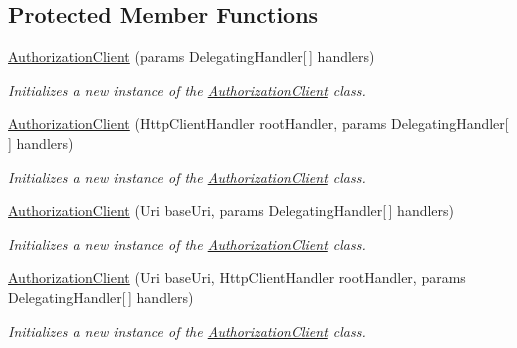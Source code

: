 \subsection*{Protected Member Functions}
\begin{DoxyCompactItemize}
\item 
\hyperlink{class_microsoft_1_1_azure_1_1_management_1_1_resources_1_1_authorization_client_a245003a4655804617e3da30d844ba137}{Authorization\+Client} (params Delegating\+Handler\mbox{[}$\,$\mbox{]} handlers)
\begin{DoxyCompactList}\small\item\em Initializes a new instance of the \hyperlink{class_microsoft_1_1_azure_1_1_management_1_1_resources_1_1_authorization_client}{Authorization\+Client} class. \end{DoxyCompactList}\item 
\hyperlink{class_microsoft_1_1_azure_1_1_management_1_1_resources_1_1_authorization_client_aa01e16fc8851dcb177ca9e4f2d81496b}{Authorization\+Client} (Http\+Client\+Handler root\+Handler, params Delegating\+Handler\mbox{[}$\,$\mbox{]} handlers)
\begin{DoxyCompactList}\small\item\em Initializes a new instance of the \hyperlink{class_microsoft_1_1_azure_1_1_management_1_1_resources_1_1_authorization_client}{Authorization\+Client} class. \end{DoxyCompactList}\item 
\hyperlink{class_microsoft_1_1_azure_1_1_management_1_1_resources_1_1_authorization_client_a1816743585276fc4d6c92cf8c8cefeea}{Authorization\+Client} (Uri base\+Uri, params Delegating\+Handler\mbox{[}$\,$\mbox{]} handlers)
\begin{DoxyCompactList}\small\item\em Initializes a new instance of the \hyperlink{class_microsoft_1_1_azure_1_1_management_1_1_resources_1_1_authorization_client}{Authorization\+Client} class. \end{DoxyCompactList}\item 
\hyperlink{class_microsoft_1_1_azure_1_1_management_1_1_resources_1_1_authorization_client_a4a6c72ff436b176067b909b472651b8d}{Authorization\+Client} (Uri base\+Uri, Http\+Client\+Handler root\+Handler, params Delegating\+Handler\mbox{[}$\,$\mbox{]} handlers)
\begin{DoxyCompactList}\small\item\em Initializes a new instance of the \hyperlink{class_microsoft_1_1_azure_1_1_management_1_1_resources_1_1_authorization_client}{Authorization\+Client} class. \end{DoxyCompactList}\end{DoxyCompactItemize}
